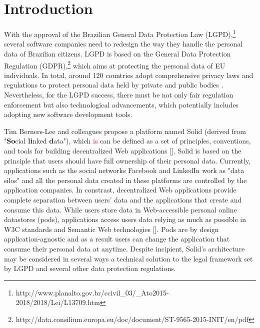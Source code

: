\documentclass[sigconf]{acmart}
\begin{document}

%

%
\maketitle

\section{Introduction}

With the approval of the Brazilian General Data Protection Law (LGPD),\footnote{http://www.planalto.gov.br/ccivil\_03/\_Ato2015-2018/2018/Lei/L13709.htm} several software companies need to redesign the way they handle the personal data of Brazilian citizens. LGPD is based on the General Data Protection Regulation (GDPR),\footnote{http://data.consilium.europa.eu/doc/document/ST-9565-2015-INIT/en/pdf} which aims at protecting the personal data of EU individuals. In total, around 120 countries adopt comprehensive privacy laws and regulations to protect personal data held by private and public bodies \cite{Banisar2011}. Nevertheless, for the LGPD success, there must be not only fair regulation enforcement but also technological advancements, which potentially includes adopting new software development tools.


Tim Berners-Lee and colleagues propose a platform named Solid (derived from "\textbf{So}cial \textbf{li}nked \textbf{d}ata"), which \textcolor{red}{is} can be defined as a set of principles, conventions, and tools for building decentralized Web applications []. Solid is based on the principle that users should have full ownership of their personal data. Currently, applications such as the social networks Facebook and LinkedIn work as "data silos" and all the personal data created in these platforms are controlled by the application companies. In constrast, decentralized Web applications provide complete separation between users' data and the applications that create and consume this data. While users store data in Web-accessible personal online datastores (pods), applications access users data relying as much as possible in W3C standards and Semantic Web technologies []. Pods are by design application-agnostic and as a result users can change the application that consume their personal data at anytime. Despite incipient, Solid's architecture may be considered in several ways a technical solution to the legal framework set by LGPD and several other data protection regulations.
\end{document}
